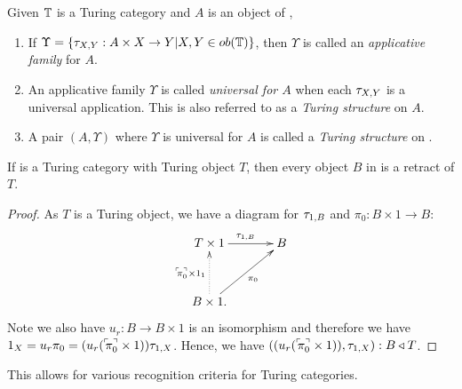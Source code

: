 \begin{definition}\label{def:turing_structure}
  Given $\mathbb{T}$ is a Turing category and $A$ is an object of \T,
  \begin{enumerate}
    \item If $\Upsilon=\{\tau_{{X},{Y}}: A\times X \to Y | X,Y \in ob(\mathbb{T})\}$, then $\Upsilon$ is called an
      \emph{applicative family} for $A$.
    \item An applicative family $\Upsilon$ is called \emph{universal for $A$} when each $\tau_{{X},{Y}}$ is
      a universal application. This is also referred to as a \emph{Turing structure} on $A$.
    \item A pair $(A,\Upsilon)$ where $\Upsilon$ is universal for $A$ is called a \emph{Turing
      structure} on \T.
  \end{enumerate}
\end{definition}

\begin{lemma}\label{lem:turing_object_is_retractable}
  If \T is a Turing category with Turing object $T$, then every object $B$ in \T is a retract of
  $T$.
\end{lemma}
\begin{proof}
  As $T$ is a Turing object, we have a diagram for $\tau_{{1},{B}}$ and $\pi_0:B\times 1 \to B$:
  \[
    \xymatrix@C+10pt@R+10pt{
      T\times 1 \ar[r]^{\tur{1}{B}} & B \\
      B\times 1. \ar@{.>}[u]^{\name{\pi_0}\times 1_1} \ar[ur]_{\pi_0}
    }
  \]
  Note we also have $u_r:B\to B\times 1$ is an
  isomorphism and therefore we have $1_X = u_r \pi_0 = (u_r ({}^\ulcorner\!\!\pi_0^\urcorner\times 1)) \tau_{{1},{X}}$. Hence, we
  have $((u_r ({}^\ulcorner\!\!\pi_0^\urcorner\times 1)), \tau_{{1},{X}}):B \triangleleft T$.
\end{proof}

This allows for various recognition criteria for Turing categories.

